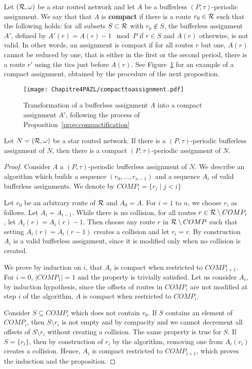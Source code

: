 Let $({\cal R},\omega)$ be a star routed network and let $A$ be a bufferless $(P,\tau)$-periodic assignment.
We say that that $A$ is \textbf{compact} if there is a route $r_0 \in \cal{R}$ such that the following holds: for all subsets $S\subset \cal{R}$ with $r_0 \notin S$, the bufferless assignment $A'$, defined by $A'(r) = A(r) - 1 \mod P$ if $r \in S$ and $A(r)$ otherwise, is not valid. In other words, an assignment is compact if for all routes $r$ but one, $A(r)$ cannot be reduced by one, that is either in the first or the second period, there is a route $r'$ using the tics just before $A(r)$. See Figure~\ref{fig:compact} for an example of a compact assignment, obtained by the procedure of the next proposition. 
  \begin{figure}
      \begin{center} 
      \texttt{[image: Chapitre4PAZL/compacttoassignment.pdf]}
      \end{center}
      \caption{Transformation of a bufferless assignment $A$ into a compact assignment $A'$, following the process of Proposition~\ref{prop:compactification}}
      \label{fig:compact}
      \end{figure}
\begin{proposition}\label{prop:compactification}
Let $N = ({\cal R}, \omega)$ be a star routed network. If there is a $(P,\tau)$-periodic bufferless assignment of $N$, then there is a compact $(P,\tau)$-periodic assignment of $N$.
\end{proposition}
\begin{proof}
Consider $A$ a $(P,\tau)$-periodic bufferless assignment of $N$.
We describe an algorithm which builds a sequence $(r_0,\dots,r_{n-1})$ and a sequence  
$A_i$ of valid bufferless assignments. We denote by $COMP_i = \{ r_j \mid j < i\}$

Let $r_0$ be an arbitrary route of ${\cal R}$ and $A_0 = A$. For $i = 1$ to $n$, we choose $r_i$ as follows.
Let $A_{i} = A_{i-1}$. While there is no collision, for all routes $r \in {\cal R} \setminus COMP_i$, let $A_i(r) = A_i(r) - 1$. Then choose any route $r$ in ${\cal R} \setminus COMP$ such that setting $A_i(r) = A_i(r-1)$ creates a collision and let $r_i = r$. By construction $A_i$ is a valid bufferless assignment, since it is modified only when no collision is created.

We prove by induction on $i$, that $A_i$ is compact when restricted to $COMP_{i+1}$.
For $i = 0$, $|COMP_1| = 1$ and the property is trivially satisfied. Let us consider $A_i$,
by induction hypothesis, since the offsets of routes in $COMP_{i}$ are not modified at step $i$ of the algorithm, $A$ is compact when restricted to $COMP_{i}$. 

 Consider $S \subseteq COMP_i$ which does not contain $r_0$. If $S$ contains
an element of $COMP_{i}$, then $S \setminus {r_i}$ is not empty and by compacity and we cannot decrement all offsets of $S\setminus {r_i}$ without creating a collision. The same property is true for $S$. If $S = \{r_i\}$, then by construction of $r_i$ by the algorithm, removing one from $A_i(r_i)$ creates a collision. Hence,
$A_i$ is compact restricted to $COMP_{i+1}$, which proves the induction and the proposition.
\end{proof}

